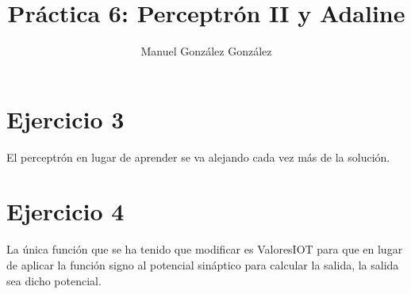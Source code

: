 \documentclass[12pt]{article}
\title{Pr\'actica 6: Perceptr\'on II y Adaline}
\author{Manuel Gonz\'alez Gonz\'alez}
\begin{document}
\maketitle

\section*{Ejercicio 3}
El perceptr\'on en lugar de aprender se va alejando cada vez m\'as de la soluci\'on.

\section*{Ejercicio 4}
La \'unica funci\'on que se ha tenido que modificar es ValoresIOT para que en lugar de aplicar la funci\'on signo al potencial sin\'aptico para calcular la salida, la salida sea dicho potencial.
\end{document}
